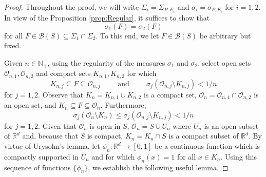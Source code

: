 \documentclass[11pt, letter]{book}
\begin{document}
\begin{proof}
Throughout the proof, we will write $\Sigma_i=\Sigma_{P,E_i}$ and $\sigma_i=\sigma_{P,E_i}$ for $i=1,2$. In view of the Proposition \ref{prop:Regular}, it suffices to show that 
\begin{equation*}
\sigma_1(F)=\sigma_2(F)
\end{equation*}
for all $F\in \mathcal{B}(S)\subseteq \Sigma_{1}\cap\Sigma_{2}$. To this end, we let $F\in\mathcal{B}(S)$ be arbitrary but fixed. 

Given $n\in\mathbb{N}_+$, using the regularity of the measures $\sigma_1$ and $\sigma_2$, select open sets $\mathcal{O}_{n,1},\mathcal{O}_{n,2}$ and compact sets $K_{n,1},K_{n,2}$ for which
\begin{equation*}
K_{n,j}\subseteq F\subseteq \mathcal{O}_{n,j}\hspace{1cm}\mbox{and}\hspace{1cm}\sigma_j(\mathcal{O}_{n,j}\setminus K_{n,j})<1/n
\end{equation*}
for $j=1,2$. Observe that $K_n=K_{n,1}\cup K_{n,2}$ is a compact set, $\mathcal{O}_n=\mathcal{O}_{n,1}\cap\mathcal{O}_{n,2}$ is an open set, and $K_n\subseteq F\subseteq \mathcal{O}_n$. Furthermore, 
\begin{equation*}
\sigma_j(\mathcal{O}_n\setminus K_n)\leq \sigma_j(\mathcal{O}_{n,j}\setminus K_{n,j})<1/n
\end{equation*}
for $j=1,2$. Given that $\mathcal{O}_n$ is open in $S$, $\mathcal{O}_n=S\cup U_n$ where $U_n$ is an open subset of $\mathbb{R}^d$ and, because that $S$ is compact, $K_n=K_n\cap S$ is a compact subset of $\mathbb{R}^d$. By virtue of Urysohn's lemma, let $\phi_n:\mathbb{R}^d\to [0,1]$ be a continuous function which is compactly supported in $U_n$ and for which $\phi_n(x)=1$ for all $x\in K_n$. Using this sequence of functions $\{\phi_n\}$, we establish the following useful lemma.


\end{proof}
\end{document}
